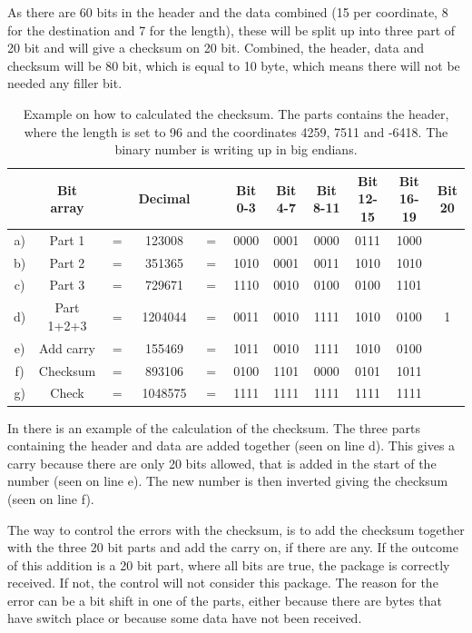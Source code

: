 As there are 60 bits in the header and the data combined (15 per coordinate, 8 for the destination and 7 for the length), these will be split up into three part of 20 bit and will give a checksum on 20 bit. Combined, the header, data and checksum will be 80 bit, which is equal to 10 byte, which means there will not be needed any filler bit.

\begin{table}[H]
\centering
\begin{tabular}{c c c c c c c c c c c}
   & Bit array  &     & Decimal &     & Bit 0-3 & Bit 4-7 & Bit 8-11 & Bit 12-15 & Bit 16-19 & Bit 20 \\
\hline
a) & Part 1     & $=$ & 123008  & $=$ & 0000 & 0001 & 0000 & 0111 & 1000 & \\
b) & Part 2     & $=$ & 351365  & $=$ & 1010 & 0001 & 0011 & 1010 & 1010 & \\
c) & Part 3     & $=$ & 729671  & $=$ & 1110 & 0010 & 0100 & 0100 & 1101 & \\
d) & Part 1+2+3 & $=$ & 1204044 & $=$ & 0011 & 0010 & 1111 & 1010 & 0100 & 1 \\
e) & Add carry  & $=$ & 155469  & $=$ & 1011 & 0010 & 1111 & 1010 & 0100 & \\
f) & Checksum   & $=$ & 893106  & $=$ & 0100 & 1101 & 0000 & 0101 & 1011 & \\
g) & Check      & $=$ & 1048575 & $=$ & 1111 & 1111 & 1111 & 1111 & 1111 & \\
\end{tabular}
\caption{Example on how to calculated the checksum. The parts contains the header, where the length is set to 96 and the coordinates 4259, 7511 and -6418. The binary number is writing up in big endians.}
\label{ChecksumExp}
\end{table}

In  there is an example of the calculation of the checksum. The three parts containing the header and data are added together (seen on line d). This gives a carry because there are only 20 bits allowed, that is added in the start of the number (seen on line e). The new number is then inverted giving the checksum (seen on line f).

The way to control the errors with the checksum, is to add the checksum together with the three 20 bit parts and add the carry on, if there are any. If the outcome of this addition is a 20 bit part, where all bits are true, the package is correctly received. If not, the control will not consider this package. The reason for the error can be a bit shift in one of the parts, either because there are bytes that have switch place or because some data have not been received. 


